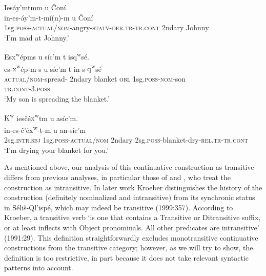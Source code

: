 \documentclass[output=paper,colorlinks,citecolor=brown]{langscibook}
\begin{document}
\ea 
\label{ex-thomason-27}
Ies\textrevglotstop\'ay'mtmm {\textltilde}u \v{C}on\'i. \\
\gll in-es-\textrevglotstop\'ay'm-t-m\'i(n)-m {\textltilde}u \v{C}on\'i \\ 
1sg.\textsc{poss}-\textsc{actual/nom}-angry-\textsc{statv-der.tr-tr.cont} 2ndary Johnny \\
\glt `I'm mad at Johnny.'
\z

\ea 
\label{ex-thomason-28}
Es{x\textsuperscript w}\'epms {\textltilde}u s\'ic'm t is{q\textsuperscript w}s\'e{\textglotstop}. \\
 \gll es-{x\textsuperscript w}\'ep-m-s {\textltilde}u s\'ic'm t
   in-s-{q\textsuperscript w}s\'e{\textglotstop} \\
\textsc{actual/nom}-spread- 2ndary
blanket \textsc{obl} 1sg.\textsc{poss}-\textsc{nom}-son\\
\textsc{tr.cont}-3.\textsc{poss} \\
 \glt `My son is spreading the blanket.'
\z

\ea 
\label{ex-thomason-29}
{K\textsuperscript w} ies\v{c}\'e{x\textsuperscript w}{\textltilde}tm {\textltilde}u as\'ic'm. \\
    in-es-\v{c}'\'e{x\textsuperscript
 w}-{\textltilde}t-m {\textltilde}u an-s\'ic'm \\
2sg.\textsc{intr.sbj} 1sg.\textsc{poss}-\textsc{actual/nom} 2ndary 2sg.\textsc{poss}-blanket-dry-\textsc{rel.tr-tr.cont} \\
   \glt `I'm drying your blanket for you.'
\z

As mentioned above, our analysis of this continuative construction as
transitive differs from previous analyses, in particular those of
\citet{Kroeber:1991} and \citet{Vogt:1940}, who treat the construction
as intransitive.  In later work Kroeber distinguishes the history of
the construction (definitely nominalized and intransitive) from its
synchronic status in S\'eli\v{s}-Ql'isp\'e, which may indeed be
transitive (1999:357).  According to Kroeber, a transitive verb `is
one that contains a Transitive or Ditransitive suffix, or at least
inflects with Object pronominals.  All other predicates are
intransitive' (1991:29).  This definition straightforwardly excludes
monotransitive continuative constructions from the transitive
category; however, as we will try to show, the definition is too
restrictive, in part because it does not take relevant syntactic
patterns into account.
\end{document}
